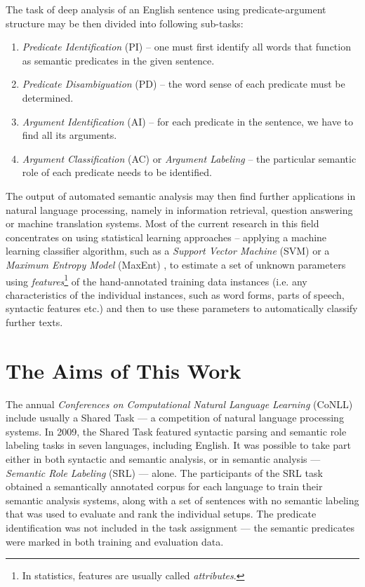 \documentclass[12pt,notitlepage]{report}
\begin{document}
The task of deep analysis of an English sentence using predicate-argument structure may be then divided into following sub-tasks:
\begin{enumerate}
    \item \emph{Predicate Identification} (PI) -- one must first identify all words that function as semantic predicates in the given sentence.
    \item \emph{Predicate Disambiguation} (PD) -- the word sense of each predicate must be determined.
    \item \emph{Argument Identification}  (AI) -- for each predicate in the sentence, we have to find all its arguments.
    \item \emph{Argument Classification} (AC) or \emph{Argument Labeling} -- the particular semantic role of each predicate needs to be identified.
\end{enumerate}

The output of automated semantic analysis may then find further applications in natural language processing, namely in information retrieval, question answering or machine translation systems. Most of the current research in this field concentrates on using statistical learning approaches -- applying a machine learning classifier algorithm, such as a \emph{Support Vector Machine} (SVM) \citep{boser92} or a \emph{Maximum Entropy Model} (MaxEnt) \citep{jelinek97}, to estimate a set of unknown parameters using \emph{features}\footnote{In statistics, features are usually called \emph{attributes}.} of the hand-annotated training data instances (i.e. any characteristics of the individual instances, such as word forms, parts of speech, syntactic features etc.) and then to use these parameters to automatically classify further texts.

\section{The Aims of This Work}\label{aims}

The annual \emph{Conferences on Computational Natural Language Learning} (CoNLL) include usually a Shared Task --- a competition of natural language processing systems. In 2009, the Shared Task \citep{hajic09} featured syntactic parsing and semantic role labeling tasks in seven languages, including English. It was possible to take part either in both syntactic and semantic analysis, or in semantic analysis --- \emph{Semantic Role Labeling} (SRL) --- alone. The participants of the SRL task obtained a semantically annotated corpus for each language to train their semantic analysis systems, along with a set of sentences with no semantic labeling that was used to evaluate and rank the individual setups. The predicate identification was not included in the task assignment --- the semantic predicates were marked in both training and evaluation data.
\end{document}

